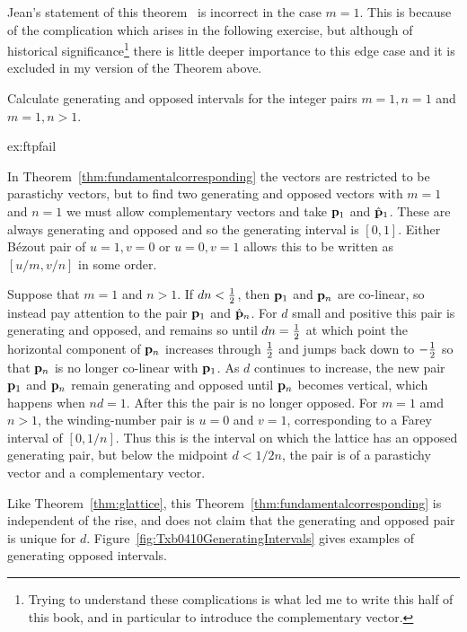 Jean's statement of this theorem~\autocite{jeanPhyllotaxisSystemicStudy1994} is incorrect in the case $m=1$. This is because of the complication which arises in the following exercise, but although of historical significance\footnote{Trying to understand these complications is what led me to write this half of this book, and in particular to introduce the complementary vector.} there is little deeper importance to this edge case and it is excluded in my version of the Theorem above.

\begin{jExercise}\label{ex:ftpfail}
	Calculate generating and opposed intervals for the integer pairs $m=1,n=1$ and $m=1,n>1$.
\end{jExercise}
\begin{jAnswer}{ex:ftpfail}{
	In Theorem~\ref{thm:fundamentalcorresponding} the vectors are restricted to be parastichy vectors, but to find two generating and opposed vectors  with $m=1$ and $n=1$ we must allow complementary vectors and take ${\mathbf p}_{1}$ and $\hat{\mathbf p}_{1}$. 
	These are always generating and opposed and so the generating interval is $[0,1]$. 
	Either B\'ezout pair of $u=1, v=0$ or $u=0,v=1$ allows this to be written as $[u/m,v/n]$ in some order.
	
	Suppose that $m=1$ and $n>1$. If $dn<\textstyle{\frac{1}{2}}$, then ${\mathbf p}_{1}$ and ${\mathbf p}_{n}$ are co-linear, so instead pay attention to the pair ${\mathbf p}_{1}$ and $\hat{\mathbf p}_{n}$. For $d$ small and positive this pair is generating and opposed, and remains so until $dn=\textstyle{\frac{1}{2}}$ at which point the horizontal component of ${\mathbf p}_{n}$ increases through $\textstyle{\frac{1}{2}}$ and jumps back down to $-\textstyle{\frac{1}{2}}$ so that  ${\mathbf p}_{n}$ is no longer co-linear with ${\mathbf p}_{1}$. As $d$ continues to increase, the new pair ${\mathbf p}_{1}$ and ${\mathbf p}_{n}$ remain generating and opposed until
	 ${\mathbf p}_{n}$ becomes vertical, which happens when $nd=1$. After this the pair is no longer opposed.
	 	 For $m=1$ amd $n>1$, the winding-number pair is $u=0$ and $v=1$, corresponding to a Farey interval of $[0,1/n]$. Thus this is the interval on which the lattice has an opposed generating pair, but below the midpoint $d<1/2n$, the pair is of a parastichy vector and a complementary vector. 
	 
}
\end{jAnswer}

Like Theorem~\ref{thm:glattice}, this Theorem~\ref{thm:fundamentalcorresponding} is independent of the rise, and does not claim that the generating and opposed pair is unique for $d$. Figure~\ref{fig:Txb0410GeneratingIntervals} gives examples of generating opposed intervals. %


